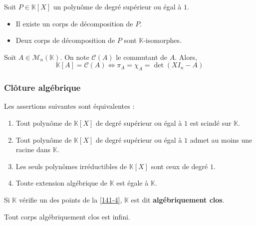 	\begin{theorem}
		Soit $P \in \mathbb{K}[X]$ un polynôme de degré supérieur ou égal à $1$.
		\begin{itemize}
			\item Il existe un corps de décomposition de $P$.
			\item Deux corps de décomposition de $P$ sont $\mathbb{K}$-isomorphes.
		\end{itemize}
	\end{theorem}


	\begin{application}
		Soit $A \in \mathcal{M}_n(\mathbb{K})$. On note $\mathcal{C}(A)$ le commutant de $A$. Alors,
		\[ \mathbb{K}[A] = \mathcal{C}(A) \iff \pi_A = \chi_A = \det(XI_n - A) \]
	\end{application}

	\subsubsection{Clôture algébrique}


	\begin{proposition}
		\label{141-4}
		Les assertions suivantes sont équivalentes :
		\begin{enumerate}[label=(\roman*)]
			\item Tout polynôme de $\mathbb{K}[X]$ de degré supérieur ou égal à $1$ est scindé sur $\mathbb{K}$.
			\item Tout polynôme de $\mathbb{K}[X]$ de degré supérieur ou égal à $1$ admet au moins une racine dans $\mathbb{K}$.
			\item Les seuls polynômes irréductibles de $\mathbb{K}[X]$ sont ceux de degré $1$.
			\item Toute extension algébrique de $\mathbb{K}$ est égale à $\mathbb{K}$.
		\end{enumerate}
	\end{proposition}

	\begin{definition}
		Si $\mathbb{K}$ vérifie un des points de la \cref{141-4}, $\mathbb{K}$ est dit \textbf{algébriquement clos}.
	\end{definition}

	\begin{proposition}
		Tout corps algébriquement clos est infini.
	\end{proposition}

